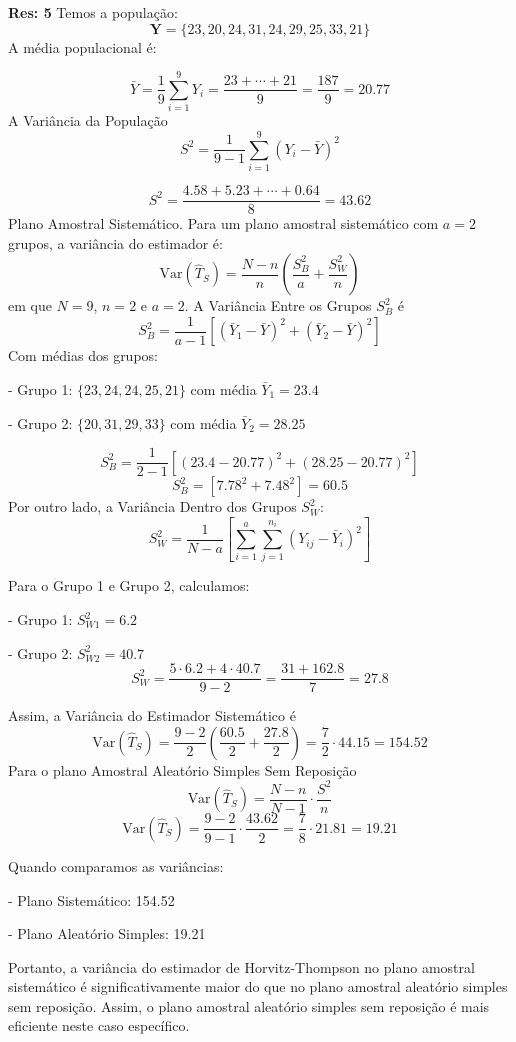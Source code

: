 \documentclass[a4paper,12pt,oneside,twocolumn]{Config/milktest}
\begin{document}
\medskip
{\scriptsize  {\bf Res: 5}
Temos a população:
\[
\mathbf{Y} = \{23, 20, 24, 31, 24, 29, 25, 33, 21\}
\] A média populacional é:

\[
\bar{Y} = \frac{1}{9} \sum_{i=1}^{9} Y_i = \frac{23 + \cdots  + 21}{9} = \frac{187}{9} = 20.77
\] 
A Variância da População 
\[
S^2 = \frac{1}{9-1} \sum_{i=1}^{9} (Y_i - \bar{Y})^2
\]

\[
S^2 = \frac{4.58 + 5.23 + \cdots + 0.64}{8} = 43.62
\] 
Plano Amostral Sistemático. Para um plano amostral sistemático com \(a = 2\) grupos, a variância do estimador é:
\[
\text{Var}(\hat{T}_{S}) = \frac{N - n}{n} \left( \frac{S^2_{B}}{a} + \frac{S^2_{W}}{n} \right)
\] em que \(N = 9\), \(n = 2\) e \(a = 2\). A Variância Entre os Grupos \(S^2_{B}\) é
\[
S^2_{B} = \frac{1}{a-1} \left[ (\bar{Y}_{1} - \bar{Y})^2 + (\bar{Y}_{2} - \bar{Y})^2 \right]
\] 
Com médias dos grupos:

- Grupo 1: \( \{23, 24, 24, 25, 21\} \) com média \( \bar{Y}_{1} = 23.4 \)

- Grupo 2: \( \{20, 31, 29, 33\} \) com média \( \bar{Y}_{2} = 28.25 \)

\[
S^2_{B} = \frac{1}{2-1} \left[ (23.4 - 20.77)^2 + (28.25 - 20.77)^2 \right]
\]
\[
S^2_{B} = \left[ 7.78^2 + 7.48^2 \right] = 60.5
\]
Por outro lado, a Variância Dentro dos Grupos \(S^2_{W}\):
\[
S^2_{W} = \frac{1}{N - a} \left[ \sum_{i=1}^{a} \sum_{j=1}^{n_i} (Y_{ij} - \bar{Y}_{i})^2 \right]
\]

Para o Grupo 1 e Grupo 2, calculamos:

- Grupo 1: \(S^2_{W1} = 6.2\)

- Grupo 2: \(S^2_{W2} = 40.7\)
\[
S^2_{W} = \frac{5 \cdot 6.2 + 4 \cdot 40.7}{9 - 2} = \frac{31 + 162.8}{7} = 27.8
\]

Assim, a Variância do Estimador Sistemático é
\[
\text{Var}(\hat{T}_{S}) = \frac{9 - 2}{2} \left( \frac{60.5}{2} + \frac{27.8}{2} \right) = \frac{7}{2} \cdot 44.15 = 154.52
\] 
Para o plano Amostral Aleatório Simples Sem Reposição 
\[
\text{Var}(\hat{T}_{S}) = \frac{N - n}{N - 1} \cdot \frac{S^2}{n}
\]
\[
\text{Var}(\hat{T}_{S}) = \frac{9 - 2}{9 - 1} \cdot \frac{43.62}{2} = \frac{7}{8} \cdot 21.81 = 19.21
\]

Quando comparamos as variâncias:

- Plano Sistemático: 154.52

- Plano Aleatório Simples: 19.21

Portanto, a variância do estimador de Horvitz-Thompson no plano amostral sistemático é significativamente maior do que no plano amostral aleatório simples sem reposição. Assim, o plano amostral aleatório simples sem reposição é mais eficiente neste caso específico.

\vspace{17cm}
}
\vfill\eject
\end{document}
